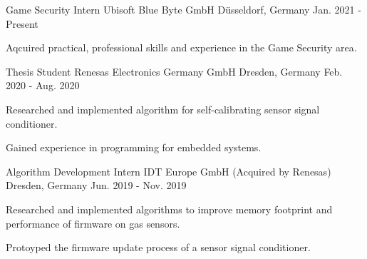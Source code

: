 

\begin{cventries}

\cventry
{Game Security Intern} %
{Ubisoft Blue Byte GmbH} %
{Düsseldorf, Germany} %
{Jan. 2021 - Present} %
{
  \begin{cvitems} %
    \item {Aqcuired practical, professional skills and experience in the Game Security area.}
  \end{cvitems}
}
\cventry
{Thesis Student} %
{Renesas Electronics Germany GmbH} %
{Dresden, Germany} %
{Feb. 2020 - Aug. 2020} %
{
  \begin{cvitems} %
    \item {Researched and implemented algorithm for self-calibrating sensor signal conditioner.}
    \item {Gained experience in programming for embedded systems.}
  \end{cvitems}
}
\cventry
{Algorithm Development Intern} %
{IDT Europe GmbH (Acquired by Renesas)} %
{Dresden, Germany} %
{Jun. 2019 - Nov. 2019} %
{
  \begin{cvitems} %
    \item {Researched and implemented algorithms to improve memory footprint and performance of firmware on gas sensors.}
    \item {Protoyped the firmware update process of a sensor signal conditioner.}
  \end{cvitems}
}

\end{cventries}

